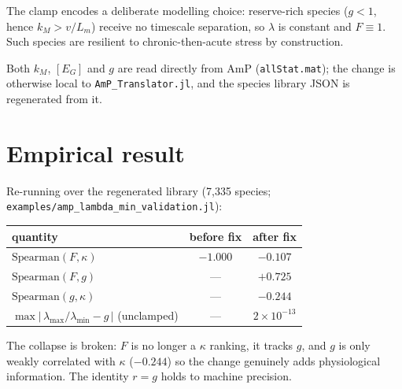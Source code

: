 \documentclass[11pt]{article}
\newcommand{\EG}{[E_G]}
\begin{document}
The clamp encodes a deliberate modelling choice: reserve-rich species ($g<1$, hence
$k_M>v/L_m$) receive no timescale separation, so $\lambda$ is constant and $F\equiv1$.
Such species are resilient to chronic-then-acute stress by construction.

Both $k_M$, $\EG$ and $g$ are read directly from AmP (\texttt{allStat.mat}); the change
is otherwise local to \texttt{AmP\_Translator.jl}, and the species library JSON is
regenerated from it.

\section{Empirical result}
Re-running over the regenerated library (7{,}335 species;
\texttt{examples/amp\_lambda\_min\_validation.jl}):

\begin{center}
\begin{tabular}{lcc}
\toprule
quantity & before fix & after fix \\
\midrule
$\mathrm{Spearman}(F,\kappa)$ & $-1.000$ & $-0.107$ \\
$\mathrm{Spearman}(F,g)$      & ---      & $+0.725$ \\
$\mathrm{Spearman}(g,\kappa)$ & ---      & $-0.244$ \\
$\max|\,\lambda_{\max}/\lambda_{\min}-g\,|$ (unclamped) & --- & $2\times10^{-13}$ \\
\bottomrule
\end{tabular}
\end{center}

The collapse is broken: $F$ is no longer a $\kappa$ ranking, it tracks $g$, and $g$ is
only weakly correlated with $\kappa$ ($-0.244$) so the change genuinely adds
physiological information. The identity $r=g$ holds to machine precision.
\end{document}
